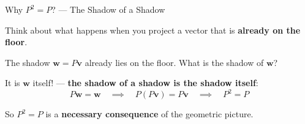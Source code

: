 \documentclass[10pt]{beamer}
\theoremstyle{definition}
\newcommand{\x}[1]{\alert{\textbf{#1}}}
\begin{document}
\begin{frame}{Why $P^2 = P$? --- The Shadow of a Shadow}

Think about what happens when you project a vector that is \x{already on the floor}.

\vspace{0.3em}

\begin{center}
\end{center}

\vspace{0.3em}

The shadow $\mathbf{w} = P\mathbf{v}$ already lies on the floor. What is the shadow of $\mathbf{w}$?

\vspace{0.3em}

It is $\mathbf{w}$ itself! --- \textbf{the shadow of a shadow is the shadow itself}:
$$P\mathbf{w} = \mathbf{w} \quad\implies\quad P(P\mathbf{v}) = P\mathbf{v} \quad\implies\quad P^2 = P$$

\vspace{0.3em}

So $P^2 = P$ is a \x{necessary consequence} of the geometric picture.

\end{frame}
\end{document}
